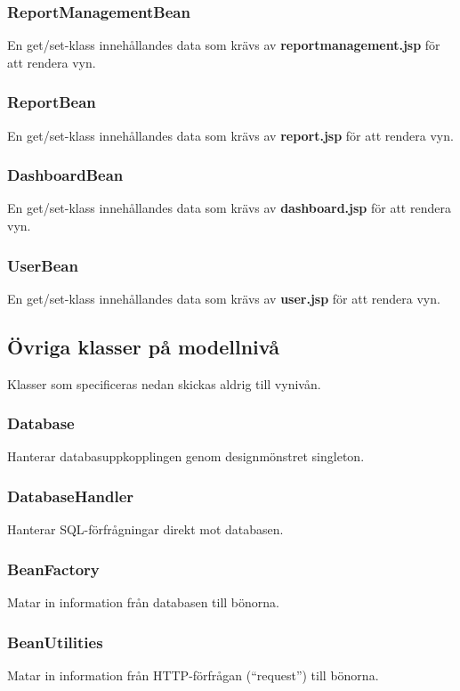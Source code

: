 \documentclass[paper=a4, fontsize=11pt,twoside]{article}
\begin{document}
\subsubsection{ReportManagementBean}
En get/set-klass innehållandes data som krävs av \textbf{reportmanagement.jsp} för att rendera vyn.

\subsubsection{ReportBean}
En get/set-klass innehållandes data som krävs av \textbf{report.jsp} för att rendera vyn.

\subsubsection{DashboardBean}
En get/set-klass innehållandes data som krävs av \textbf{dashboard.jsp} för att rendera vyn.

\subsubsection{UserBean}
En get/set-klass innehållandes data som krävs av \textbf{user.jsp} för att rendera vyn.

\subsection{Övriga klasser på modellnivå}
Klasser som specificeras nedan skickas aldrig till vynivån.

\subsubsection{Database}
Hanterar databasuppkopplingen genom designmönstret singleton.

\subsubsection{DatabaseHandler}
Hanterar SQL-förfrågningar direkt mot databasen.

\subsubsection{BeanFactory}
Matar in information från databasen till bönorna.

\subsubsection{BeanUtilities}
Matar in information från HTTP-förfrågan (“request”) till bönorna.
\end{document}
